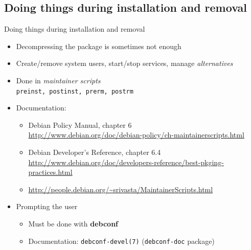 \documentclass[10pt,final]{beamer}
\begin{document}
\subsection{Doing things during installation and removal}
\begin{frame}{Doing things during installation and removal}
\begin{itemize}
\item Decompressing the package is sometimes not enough
\hbr
\item Create/remove system users, start/stop services, manage \textsl{alternatives}
\hbr
\item Done in \textsl{maintainer scripts}\\
	\texttt{preinst, postinst, prerm, postrm}
\hbr
\item Documentation:
	\begin{itemize}
		\item Debian Policy Manual, chapter 6\\
			{\footnotesize \url{http://www.debian.org/doc/debian-policy/ch-maintainerscripts.html}}
			
			\hbr
		\item Debian Developer's Reference, chapter 6.4\\
			{\scriptsize \url{http://www.debian.org/doc/developers-reference/best-pkging-practices.html}}
			\hbr
		\item {\footnotesize \url{http://people.debian.org/~srivasta/MaintainerScripts.html}}
	\end{itemize}
\br
\item Prompting the user
\begin{itemize}
	\item Must be done with \textbf{debconf}
		\hbr
	\item Documentation: \texttt{debconf-devel(7)} (\texttt{debconf-doc} package)
\end{itemize}
\end{itemize}
\end{frame}
\end{document}
